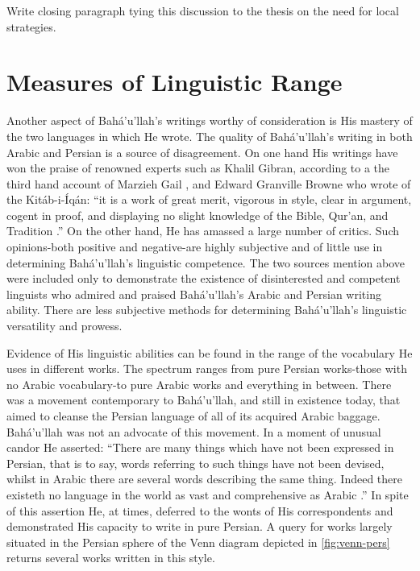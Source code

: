\documentclass[12pt, oneside]{report}
\begin{document}
\par
Write closing paragraph tying this discussion to the thesis on the need for local strategies.

\section{Measures of Linguistic Range}
\par
Another aspect of Bah\'{a}'u'llah's writings worthy of consideration is His mastery of the two languages in which He wrote.
The quality of Bah\'{a}'u'llah's writing in both Arabic and Persian is a source of disagreement.
On one hand His writings have won the praise of renowned experts such as Khalil Gibran, according to a the third hand account of Marzieh Gail \cite{gail_world_1978}, and Edward Granville Browne who wrote of the Kit\'{a}b-i-\'{I}q\'{a}n: ``it is a work of great merit, vigorous in style, clear in argument, cogent in proof, and displaying no slight knowledge of the Bible, Qur'an, and Tradition \cite{momen_selections_1987}.''
On the other hand, He has amassed a large number of critics.
Such opinions-both positive and negative-are highly subjective and of little use in determining Bah\'{a}'u'llah's linguistic competence.
The two sources mention above were included only to demonstrate the existence of disinterested and competent linguists who admired and praised Bah\'{a}'u'llah's Arabic and Persian writing ability.
There are less subjective methods for determining Bah\'{a}'u'llah's linguistic versatility and prowess.
\par
Evidence of His linguistic abilities can be found in the range of the vocabulary He uses in different works.
The spectrum ranges from pure Persian works-those with no Arabic vocabulary-to pure Arabic works and everything in between.
There was a movement contemporary to Bah\'{a}'u'llah, and still in existence today, that aimed to cleanse the Persian language of all of its acquired Arabic baggage.
Bah\'{a}'u'llah was not an advocate of this movement.
In a moment of unusual candor He asserted: ``There are many things which have not been expressed in Persian, that is to say, words referring to such things have not been devised, whilst in Arabic there are several words describing the same thing. Indeed there existeth no language in the world as vast and comprehensive as Arabic \cite{bahaullah_tabernacle_2006}.''
In spite of this assertion He, at times, deferred to the wonts of His correspondents and demonstrated His capacity to write in pure Persian.
A query for works largely situated in the Persian sphere of the Venn diagram depicted in \autoref{fig:venn-pers} returns several works written in this style.
\end{document}
